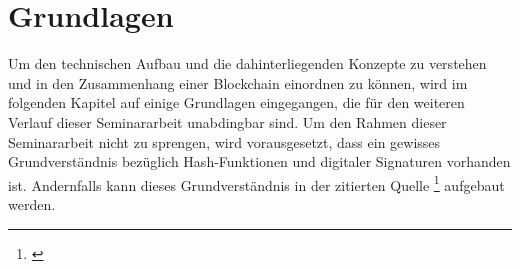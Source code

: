 \chapter{Grundlagen}

Um den technischen Aufbau und die dahinterliegenden Konzepte zu verstehen und in den Zusammenhang einer Blockchain einordnen zu können, wird im folgenden Kapitel auf einige Grundlagen eingegangen, die für den weiteren Verlauf dieser Seminararbeit unabdingbar sind. Um den Rahmen dieser Seminararbeit nicht zu sprengen, wird vorausgesetzt, dass ein gewisses Grundverständnis bezüglich Hash-Funktionen und digitaler Signaturen vorhanden ist. Andernfalls kann dieses Grundverständnis in der zitierten Quelle \footnote{\parencite{Raikwar.2019}} aufgebaut werden.




